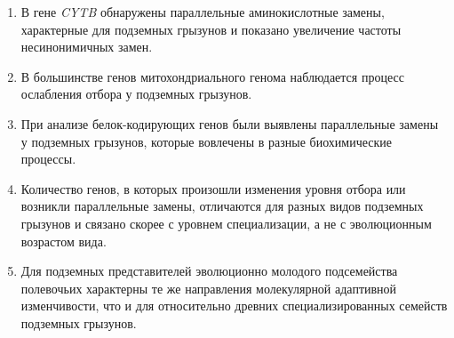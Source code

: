 \begin{enumerate}
	
\item В гене \textit{CYTB} обнаружены параллельные аминокислотные замены, характерные для подземных грызунов и показано увеличение частоты несинонимичных замен.

\item В большинстве генов митохондриального генома наблюдается процесс ослабления отбора у подземных грызунов. 
 
\item При анализе белок-кодирующих генов были выявлены параллельные замены у подземных грызунов, которые вовлечены в разные биохимические процессы. 

\item Количество генов, в которых произошли изменения уровня отбора или возникли параллельные замены, отличаются для разных видов подземных грызунов и связано скорее с уровнем специализации, а не с эволюционным возрастом вида. 

\item Для подземных представителей эволюционно молодого подсемейства полевочьих характерны те же направления молекулярной адаптивной изменчивости, что и для относительно древних специализированных семейств подземных грызунов.
 

\end{enumerate}

